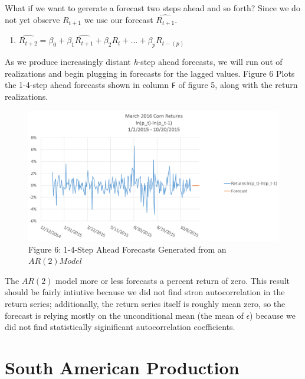 \documentclass[
  letterpaper,
  DIV=11,
  numbers=noendperiod]{scrreprt}
\providecommand{\tightlist}{%
  \setlength{\itemsep}{0pt}\setlength{\parskip}{0pt}}\usepackage{longtable,booktabs,array}
\begin{document}
What if we want to gererate a forecast two steps ahead and so forth?
Since we do not yet observe \(R_{t+1}\) we use our forecast
\(\hat{R_{t+1}}\).

\begin{enumerate}
\def\labelenumi{\arabic{enumi}.}
\setcounter{enumi}{4}
\tightlist
\item
  \(\hat{R_{t+2}} = \beta_0 + \beta_1\hat{R_{t+1}} + \beta_2R_{t}+ ... + \beta_{p}R_{t-(p)}\)
\end{enumerate}

As we produce increasingly distant \emph{h}-step ahead forecasts, we
will run out of realizations and begin plugging in forecasts for the
lagged values. Figure 6 Plots the 1-4-step ahead forecasts shown in
column \texttt{F} of figure 5, along with the return realizations.

\begin{figure}

{\centering \includegraphics{images/12_forecast_plot.png}

}

\caption{Figure 6: 1-4-Step Ahead Forecasts Generated from an
\(AR(2) Model\)}

\end{figure}

The \(AR(2)\) model more or less forecasts a percent return of zero.
This result should be fairly intiutive because we did not find stron
autocorrelation in the return series; additionally, the return series
itself is roughly mean zero, so the forecast is relying mostly on the
unconditional mean (the mean of \(\epsilon\)) because we did not find
statistically siginificant autocorrelation coefficients.


\hypertarget{south-american-production}{%
\chapter{South American Production}\label{south-american-production}}
\end{document}
